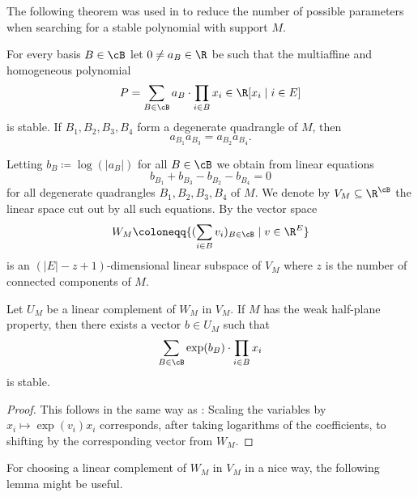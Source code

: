 The following theorem was used in \cite{BrandenDLeon} to reduce the number of possible parameters when searching for a stable polynomial with support $M$.

\begin{thm}\label{thm:degQuadCoeffs}
    For every basis $B\in\cB$ let $0\neq a_B\in\R$ be such that the multiaffine and homogeneous polynomial
    \begin{equation*}
        P=\sum_{B\in\cB}a_{B}\cdot\prod_{i\in B}x_i\in\R[x_i\mid i\in E]
    \end{equation*}
    is stable. If $B_1,B_2,B_3,B_4$ form a degenerate quadrangle of $M$, then
    \begin{equation}\label{eq:deg4}
      a_{B_1}a_{B_3}=a_{B_2}a_{B_4}.  
    \end{equation}
\end{thm}
 Letting $b_B\coloneqq \log(|a_B|)$ for all $B\in\cB$ we obtain from  linear equations
 \begin{equation*}
  b_{B_1}+b_{B_3}-b_{B_2}-b_{B_4}=0   
 \end{equation*}
for all degenerate quadrangles $B_1,B_2,B_3,B_4$ of $M$. We denote by $V_M\subseteq\R^{\cB}$ the linear space cut out by all such equations. By \cite[Lemma~2.6]{BrandenDLeon} the vector space
\begin{equation*}
  W_M\coloneqq \{(\sum_{i\in B}v_i)_{B\in\cB}\mid v\in\R^E\}  
\end{equation*}
is an $(|E|-z+1)$-dimensional linear subspace of $V_M$ where $z$ is the number of connected components of $M$.

\begin{lem}\label{lem:rescale}
    Let $U_M$ be a linear complement of $W_M$ in $V_M$. If $M$ has the weak half-plane property, then there exists a vector $b\in U_M$ such that
    \begin{equation*}
        \sum_{B\in\cB}\exp(b_{B})\cdot\prod_{i\in B}x_i
    \end{equation*}
    is stable.
\end{lem}

\begin{proof}
    This follows in the same way as \cite[Theorem~2.3]{BrandenDLeon}: Scaling the variables by $x_i\mapsto\exp(v_i)x_i$ corresponds, after taking logarithms of the coefficients, to shifting by the corresponding vector from $W_M$.
\end{proof}

For choosing a linear complement of $W_M$ in $V_M$ in a nice way, the following lemma might be useful.

